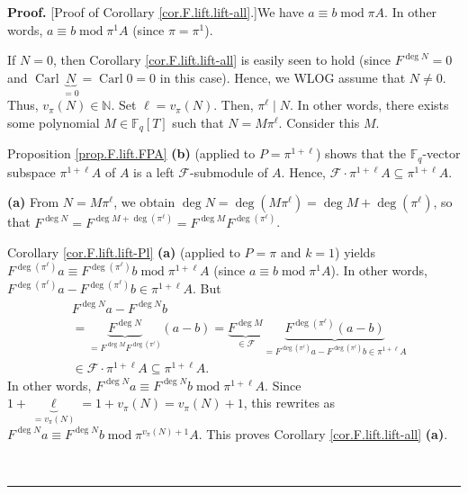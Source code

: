 \documentclass[numbers=enddot,12pt,final,onecolumn,notitlepage]{scrartcl}%
\theoremstyle{definition}
\newenvironment{proof}[1][Proof]{\noindent\textbf{#1.} }{\ \rule{0.5em}{0.5em}}
\begin{document}
\begin{proof}
[Proof of Corollary \ref{cor.F.lift.lift-all}.]We have $a\equiv
b\operatorname{mod}\pi A$. In other words, $a\equiv b\operatorname{mod}\pi
^{1}A$ (since $\pi=\pi^{1}$).

If $N=0$, then Corollary \ref{cor.F.lift.lift-all} is easily seen to hold
(since $F^{\deg N}=0$ and $\operatorname*{Carl}\underbrace{N}_{=0}%
=\operatorname*{Carl}0=0$ in this case). Hence, we WLOG assume that $N\neq0$.
Thus, $v_{\pi}\left(  N\right)  \in\mathbb{N}$. Set $\ell=v_{\pi}\left(
N\right)  $. Then, $\pi^{\ell}\mid N$. In other words, there exists some
polynomial $M\in\mathbb{F}_{q}\left[  T\right]  $ such that $N=M\pi^{\ell}$.
Consider this $M$.

Proposition \ref{prop.F.lift.FPA} \textbf{(b)} (applied to $P=\pi^{1+\ell}$)
shows that the $\mathbb{F}_{q}$-vector subspace $\pi^{1+\ell}A$ of $A$ is a
left $\mathcal{F}$-submodule of $A$. Hence, $\mathcal{F}\cdot\pi^{1+\ell
}A\subseteq\pi^{1+\ell}A$. \medskip

\textbf{(a)} From $N=M\pi^{\ell}$, we obtain $\deg N=\deg\left(  M\pi^{\ell
}\right)  =\deg M+\deg\left(  \pi^{\ell}\right)  $, so that $F^{\deg
N}=F^{\deg M+\deg\left(  \pi^{\ell}\right)  }=F^{\deg M}F^{\deg\left(
\pi^{\ell}\right)  }$.

Corollary \ref{cor.F.lift.lift-Pl} \textbf{(a)} (applied to $P=\pi$ and $k=1$)
yields \newline$F^{\deg\left(  \pi^{\ell}\right)  }a\equiv F^{\deg\left(
\pi^{\ell}\right)  }b\operatorname{mod}\pi^{1+\ell}A$ (since $a\equiv
b\operatorname{mod}\pi^{1}A$). In other words, $F^{\deg\left(  \pi^{\ell
}\right)  }a-F^{\deg\left(  \pi^{\ell}\right)  }b\in\pi^{1+\ell}A$. But
\begin{align*}
&  F^{\deg N}a-F^{\deg N}b\\
&  =\underbrace{F^{\deg N}}_{=F^{\deg M}F^{\deg\left(  \pi^{\ell}\right)  }%
}\left(  a-b\right)  =\underbrace{F^{\deg M}}_{\in\mathcal{F}}%
\underbrace{F^{\deg\left(  \pi^{\ell}\right)  }\left(  a-b\right)  }%
_{=F^{\deg\left(  \pi^{\ell}\right)  }a-F^{\deg\left(  \pi^{\ell}\right)
}b\in\pi^{1+\ell}A}\\
&  \in\mathcal{F}\cdot\pi^{1+\ell}A\subseteq\pi^{1+\ell}A.
\end{align*}
In other words, $F^{\deg N}a\equiv F^{\deg N}b\operatorname{mod}\pi^{1+\ell}%
A$. Since $1+\underbrace{\ell}_{=v_{\pi}\left(  N\right)  }=1+v_{\pi}\left(
N\right)  =v_{\pi}\left(  N\right)  +1$, this rewrites as $F^{\deg N}a\equiv
F^{\deg N}b\operatorname{mod}\pi^{v_{\pi}\left(  N\right)  +1}A$. This proves
Corollary \ref{cor.F.lift.lift-all} \textbf{(a)}. \medskip


\end{proof}
\end{document}
